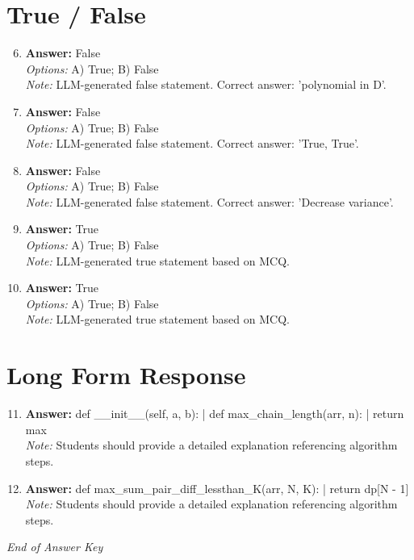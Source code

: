\documentclass[12pt]{article}
\begin{document}
\section*{True / False}
\begin{enumerate}[label=\arabic*.]
\setcounter{enumi}{5}
\item \textbf{Answer:} False
\\ \textit{Options:} A) True; B) False
\\ \textit{Note:} LLM-generated false statement. Correct answer: 'polynomial in D'.
\item \textbf{Answer:} False
\\ \textit{Options:} A) True; B) False
\\ \textit{Note:} LLM-generated false statement. Correct answer: 'True, True'.
\item \textbf{Answer:} False
\\ \textit{Options:} A) True; B) False
\\ \textit{Note:} LLM-generated false statement. Correct answer: 'Decrease variance'.
\item \textbf{Answer:} True
\\ \textit{Options:} A) True; B) False
\\ \textit{Note:} LLM-generated true statement based on MCQ.
\item \textbf{Answer:} True
\\ \textit{Options:} A) True; B) False
\\ \textit{Note:} LLM-generated true statement based on MCQ.
\end{enumerate}

\section*{Long Form Response}
\begin{enumerate}[label=\arabic*.]
\setcounter{enumi}{10}
\item \textbf{Answer:} def \_\_init\_\_(self, a, b): | def max\_chain\_length(arr, n): | return max
\\ \textit{Note:} Students should provide a detailed explanation referencing algorithm steps.
\item \textbf{Answer:} def max\_sum\_pair\_diff\_lessthan\_K(arr, N, K): | return dp[N - 1]
\\ \textit{Note:} Students should provide a detailed explanation referencing algorithm steps.
\end{enumerate}

\vfill
\noindent\textit{End of Answer Key}
\end{document}
